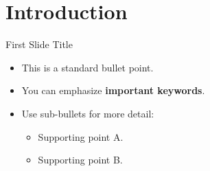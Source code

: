 \section{Introduction}
\begin{frame}{First Slide Title}
    \begin{itemize}
        \item This is a standard bullet point.
        \item You can emphasize \textbf{important keywords}.
        \item Use sub-bullets for more detail:
        \begin{itemize}
            \item Supporting point A.
            \item Supporting point B.
        \end{itemize}
    \end{itemize}
\end{frame}